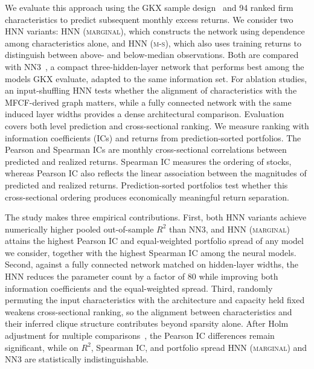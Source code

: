 \documentclass[sigconf,nonacm]{acmart}
\newcommand{\ParamRatio}{80}
\newcommand{\HNNMarg}{\textsc{HNN (marginal)}}
\newcommand{\HNNMS}{\textsc{HNN (m-s)}}
\newcommand{\NNThree}{\textsc{NN3}}
\begin{document}
We evaluate this approach using the GKX sample design~\cite{gu2020} and 94
ranked firm characteristics to predict subsequent monthly excess returns. We
consider two HNN variants: \HNNMarg{}, which constructs the network using
dependence among characteristics alone, and \HNNMS{}, which also uses training
returns to distinguish between above- and below-median observations. Both are compared with \NNThree{}~\cite{gu2020}, a compact three-hidden-layer
network that performs best among the models GKX evaluate, adapted
to the same information set.
 For ablation studies, an input-shuffling HNN tests
whether the alignment of characteristics with the MFCF-derived graph matters,
while a fully connected network with the same induced layer widths provides a
dense architectural comparison. Evaluation covers both level prediction and cross-sectional ranking. We measure
ranking with information coefficients (ICs) and returns from prediction-sorted
portfolios. The Pearson and Spearman ICs are monthly cross-sectional
correlations between predicted and realized returns. Spearman IC measures the ordering of stocks, whereas Pearson IC also reflects
the linear association between the magnitudes of predicted and realized
returns. Prediction-sorted portfolios test whether this cross-sectional
ordering produces economically meaningful return separation.

The study makes three empirical contributions. First, both HNN variants achieve
numerically higher pooled out-of-sample \(R^2\) than \NNThree{}, and \HNNMarg{}
attains the highest Pearson IC and equal-weighted portfolio spread of any model
we consider, together with the highest Spearman IC among the neural models.
Second, against a fully connected network matched on hidden-layer widths, the
HNN reduces the parameter count by a factor of \ParamRatio{} while improving
both information coefficients and the equal-weighted spread. Third, randomly
permuting the input characteristics with the architecture and capacity held
fixed weakens cross-sectional ranking, so the alignment between characteristics
and their inferred clique structure contributes beyond sparsity alone. After Holm
adjustment for multiple comparisons~\cite{holm1979}, the Pearson IC differences
remain significant, while on \(R^2\), Spearman IC, and portfolio spread \HNNMarg{} and \NNThree{} are statistically indistinguishable.


\end{document}
